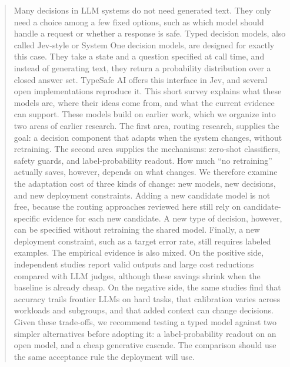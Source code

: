 \begin{abstract}

Many decisions in LLM systems do not need generated text. They only need a choice among a few fixed options, such as which model should handle a request or whether a response is safe. Typed decision models, also called Jev-style or System One decision models, are designed for exactly this case. They take a state and a question specified at call time, and instead of generating text, they return a probability distribution over a closed answer set. TypeSafe AI offers this interface in Jev, and several open implementations reproduce it. This short survey explains what these models are, where their ideas come from, and what the current evidence can support. These models build on earlier work, which we organize into two areas of earlier research. The first area, routing research, supplies the goal: a decision component that adapts when the system changes, without retraining. The second area supplies the mechanisms: zero-shot classifiers, safety guards, and label-probability readout. How much ``no retraining'' actually saves, however, depends on what changes. We therefore examine the adaptation cost of three kinds of change: new models, new decisions, and new deployment constraints. Adding a new candidate model is not free, because the routing approaches reviewed here still rely on candidate-specific evidence for each new candidate. A new type of decision, however, can be specified without retraining the shared model. Finally, a new deployment constraint, such as a target error rate, still requires labeled examples. The empirical evidence is also mixed. On the positive side, independent studies report valid outputs and large cost reductions compared with LLM judges, although these savings shrink when the baseline is already cheap. On the negative side, the same studies find that accuracy trails frontier LLMs on hard tasks, that calibration varies across workloads and subgroups, and that added context can change decisions. Given these trade-offs, we recommend testing a typed model against two simpler alternatives before adopting it: a label-probability readout on an open model, and a cheap generative cascade. The comparison should use the same acceptance rule the deployment will use.
 

\end{abstract}

